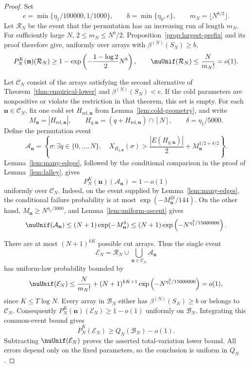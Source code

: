 \begin{proof}
Set
\[
 e=\min\{\eta_1/100000,1/1000\},\qquad
 b=\min\{\eta_0,e\},\qquad
 m_N=\lfloor N^{b/2}\rfloor.
\]
Let $\mathcal R_N$ be the event that the permutation has an
increasing run of length $m_N$. For sufficiently large $N$,
$2\le m_N\le N^b/2$. Proposition~\ref{prop:largest-prefix} and
its proof therefore give, uniformly over arrays with
$\beta^{(N)}(S_N)\ge b$,
\[
 P_N^K(\mathbf n)(\mathcal R_N)
 \ge1-\exp\left(-\frac{1-\log2}{2}N^b\right),\qquad
 \nuUnif(\mathcal R_N)\le\frac{N}{m_N!}=o(1).
\]

Let $\mathcal C_N$ consist of the arrays satisfying the second
alternative of Theorem~\ref{thm:empirical-lower} and
$\beta^{(N)}(S_N)<e$. If the cold parameters are nonpositive or
violate the restriction in that theorem, this set is empty.
For each $\mathbf n\in\mathcal C_N$, fix one cold set
$H_{\mathrm{rel},\mathbf n}$ from
Lemma~\ref{lem:cold-geometry}, and write
\[
 M_{\mathbf n}=|H_{\mathrm{rel},\mathbf n}|,\qquad
 H_{q,\mathbf n}=(q+H_{\mathrm{rel},\mathbf n})\cap[N],\qquad
 \delta=\eta_1/5000.
\]
Define the permutation event
\[
 \mathcal A_{\mathbf n}
 =\left\{\sigma:\exists q\in\{0,\ldots,N\},\quad
 X_{H_{q,\mathbf n}}(\sigma)>
 \frac{|E(H_{q,\mathbf n})|}{2}
       +M_{\mathbf n}^{1/2+\delta/2}\right\}.
\]
Lemma~\ref{lem:many-edges}, followed by the conditional comparison
in the proof of Lemma~\ref{lem:lalley}, gives
\[
 P_N^K(\mathbf n)(\mathcal A_{\mathbf n})=1-o(1)
\]
uniformly over $\mathcal C_N$. Indeed, on the event supplied by
Lemma~\ref{lem:many-edges}, the conditional failure probability
is at most $\exp(-M_{\mathbf n}^{2\delta}/144)$.
On the other hand, $M_{\mathbf n}\ge N^{\eta_1/3000}$, and
Lemma~\ref{lem:uniform-ascent} gives
\[
 \nuUnif(\mathcal A_{\mathbf n})
 \le (N+1)\exp(-M_{\mathbf n}^{\delta})
 \le (N+1)\exp\left(-N^{\eta_1^2/15000000}\right).
\]

There are at most $(N+1)^{kK}$ possible cut arrays. Thus the
single event
\[
 \mathcal E_N=\mathcal R_N\cup
           \bigcup_{\mathbf n\in\mathcal C_N}\mathcal A_{\mathbf n}
\]
has uniform-law probability bounded by
\[
 \nuUnif(\mathcal E_N)
 \le\frac{N}{m_N!}
 +(N+1)^{kK+1}\exp\left(-N^{\eta_1^2/15000000}\right)
 =o(1),
\]
since $K\le T\log N$.
Every array in $\mathcal B_N$ either has
$\beta^{(N)}(S_N)\ge b$ or belongs to $\mathcal C_N$.
Consequently
$P_N^K(\mathbf n)(\mathcal E_N)\ge1-o(1)$ uniformly on
$\mathcal B_N$. Integrating this common-event bound gives
\[
 \overline P_N^K(\mathcal E_N)\ge Q_N(\mathcal B_N)-o(1).
\]
Subtracting $\nuUnif(\mathcal E_N)$ proves the asserted
total-variation lower bound. All errors depend only on the fixed
parameters, so the conclusion is uniform in $Q_N$.
\end{proof}
